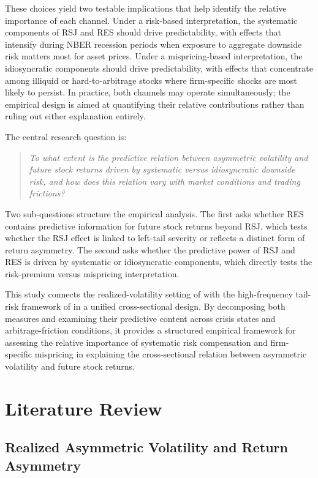 \documentclass[11pt,a4paper]{article}
\begin{document}
These choices yield two testable implications that help identify the relative importance of each channel. Under a risk-based interpretation, the systematic components of RSJ and RES should drive predictability, with effects that intensify during NBER recession periods when exposure to aggregate downside risk matters most for asset prices. Under a mispricing-based interpretation, the idiosyncratic components should drive predictability, with effects that concentrate among illiquid or hard-to-arbitrage stocks where firm-specific shocks are most likely to persist. In practice, both channels may operate simultaneously; the empirical design is aimed at quantifying their relative contributions rather than ruling out either explanation entirely.
 
The central research question is:
 
\begin{quote}
\textit{To what extent is the predictive relation between asymmetric volatility and future stock returns driven by systematic versus idiosyncratic downside risk, and how does this relation vary with market conditions and trading frictions?}
\end{quote}
 
\noindent Two sub-questions structure the empirical analysis. The first asks whether RES contains predictive information for future stock returns beyond RSJ, which tests whether the RSJ effect is linked to left-tail severity or reflects a distinct form of return asymmetry. The second asks whether the predictive power of RSJ and RES is driven by systematic or idiosyncratic components, which directly tests the risk-premium versus mispricing interpretation.
 
This study connects the realized-volatility setting of \citet{bollerslev2020} with the high-frequency tail-risk framework of \citet{Dimitriadis03072022} in a unified cross-sectional design. By decomposing both measures and examining their predictive content across crisis states and arbitrage-friction conditions, it provides a structured empirical framework for assessing the relative importance of systematic risk compensation and firm-specific mispricing in explaining the cross-sectional relation between asymmetric volatility and future stock returns.
 
\section{Literature Review}

\subsection{Realized Asymmetric Volatility and Return Asymmetry}
\end{document}
